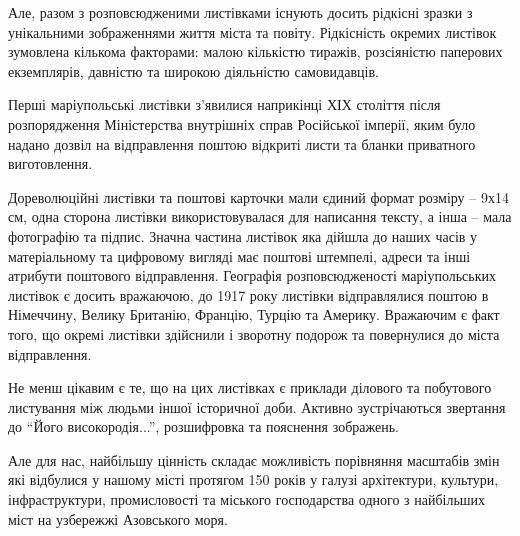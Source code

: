 
Але, разом з розповсюдженими листівками існують досить рідкісні зразки з
унікальними зображеннями життя міста та повіту. Рідкісність окремих листівок
зумовлена кількома факторами: малою кількістю тиражів, розсіяністю паперових
екземплярів, давністю та широкою діяльністю самовидавців.


Перші маріупольські листівки з'явилися наприкінці ХІХ століття після
розпорядження Міністерства внутрішніх справ Російської імперії, яким було
надано дозвіл на відправлення поштою відкриті листи та бланки приватного
виготовлення.


Дореволюційні листівки та поштові карточки мали єдиний формат розміру – 9х14
см, одна сторона листівки використовувалася для написання тексту, а інша – мала
фотографію та підпис. Значна частина листівок яка дійшла до наших часів у
матеріальному та цифровому вигляді має поштові штемпелі, адреси та інші
атрибути поштового відправлення. Географія розповсюдженості маріупольських
листівок є досить вражаючою, до 1917 року листівки відправлялися поштою в
Німеччину, Велику Британію, Францію, Турцію та Америку. Вражаючим є факт того,
що окремі листівки здійснили і зворотну подорож та повернулися до міста
відправлення.


Не менш цікавим є те, що на цих листівках є приклади ділового та побутового
листування між людьми іншої історичної доби. Активно зустрічаються звертання до
\enquote{Його високородія...}, розшифровка та пояснення зображень.


Але для нас, найбільшу цінність складає можливість порівняння масштабів змін
які відбулися у нашому місті протягом 150 років у галузі архітектури, культури,
інфраструктури, промисловості  та міського господарства одного з найбільших
міст на узбережжі Азовського моря.




